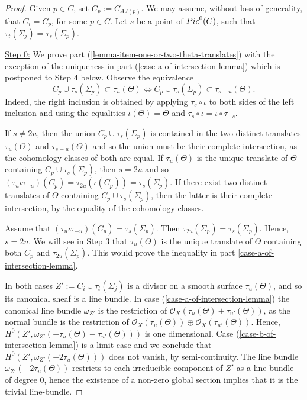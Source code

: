\documentclass[10pt,a4paper]{amsart}
\newcommand{\Pic}{{\rm Pic}}
\newcommand{\StructureSheaf}[1]{{\mathcal O}_{#1}}
\begin{document}
\begin{proof}
Given $p\in C$, set $C_p:=C_{AJ(p)}$.  We may assume, without loss of generality, that $C_i=C_p$, for some $p\in C$. 
Let $s$ be a point of $\Pic^0(C)$, such that $\tau_t(\Sigma_j)=\tau_s(\Sigma_p)$.


\underline{Step 0:} We prove part (\ref{lemma-item-one-or-two-theta-translates})  with the exception of the uniqueness in part (\ref{case-a-of-intersection-lemma}) which is postponed to Step 4 below.
Observe  the equivalence 
\begin{equation}
\label{equivalence-of-inclusions}
C_p\cup \tau_s(\Sigma_p)\subset \tau_u(\Theta)
\Leftrightarrow
C_p\cup \tau_s(\Sigma_p)\subset \tau_{s-u}(\Theta).
\end{equation}
Indeed, the right inclusion is obtained by applying $\tau_s\circ\iota$ to both sides of the left inclusion and using the equalities $\iota(\Theta)=\Theta$ and $\tau_s\circ\iota=\iota\circ\tau_{-s}$.

If $s\neq 2u$, then the union $C_p\cup \tau_s(\Sigma_p)$ is contained in the two distinct translates $\tau_u(\Theta)$ and
$\tau_{s-u}(\Theta)$ and so the union must be their complete intersection, as the cohomology classes of both are equal. If $\tau_u(\Theta)$ is the unique translate of $\Theta$ containing $C_p\cup \tau_s(\Sigma_p)$, then
$s=2u$ and so $(\tau_u\iota\tau_{-u})(C_p)=\tau_{2u}(\iota(C_p))=\tau_s(\Sigma_p)$. 
If there exist two distinct translates of $\Theta$ containing $C_p\cup \tau_s(\Sigma_p)$, then the latter is their complete intersection, by the equality of the cohomology classes. 

Assume that $(\tau_u\iota\tau_{-u})(C_p)=\tau_s(\Sigma_p)$. Then $\tau_{2u}(\Sigma_p)=\tau_s(\Sigma_p)$. Hence, $s=2u$.
We will see 
in Step 3 that $\tau_u(\Theta)$ is the unique translate of $\Theta$ containing both $C_p$ and $\tau_{2u}(\Sigma_p)$. This would prove the inequality in part \ref{case-a-of-intersection-lemma}.

In both cases $Z':=C_i\cup\tau_t(\Sigma_j)$ is a divisor on a smooth surface $\tau_u(\Theta)$, and so its canonical sheaf is a line bundle.
In case (\ref{case-a-of-intersection-lemma}) the canonical line bundle $\omega_{Z'}$  is the restriction of
$\StructureSheaf{X}(\tau_u(\Theta)+\tau_{u'}(\Theta))$, as the normal bundle is the restriction of 
$\StructureSheaf{X}(\tau_u(\Theta))\oplus \StructureSheaf{X}(\tau_{u'}(\Theta))$.
Hence, $H^0(Z',\omega_{Z'}(-\tau_u(\Theta)-\tau_{u'}(\Theta)))$ is one dimensional. Case (\ref{case-b-of-intersection-lemma})
is a limit case and we conclude that $H^0(Z',\omega_{Z'}(-2\tau_u(\Theta)))$ does not vanish, by semi-continuity. The line bundle 
$\omega_{Z'}(-2\tau_u(\Theta))$ restricts to each irreducible component of $Z'$ as a line bundle of degree $0$, hence the existence of a non-zero global section implies that it is the trivial line-bundle.


\end{proof}
\end{document}

